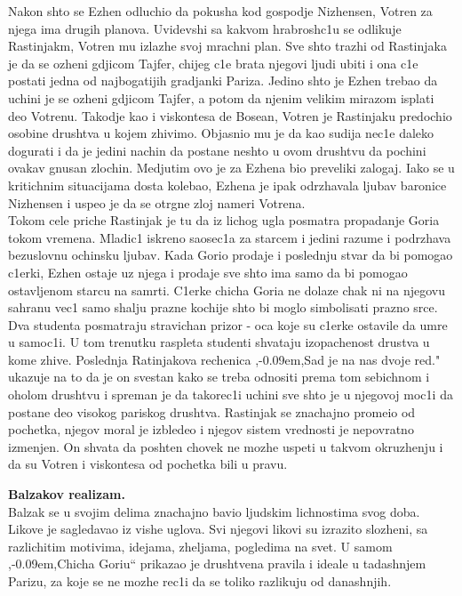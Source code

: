 \documentclass[11pt]{article}
\def \zn{,\kern-0.09em,}
\begin{document}
\begin{p}
Nakon shto se Ezhen odluchio da pokusha kod gospodje Nizhensen, Votren za njega ima drugih planova. Uvidevshi sa kakvom hrabrosh$ $c1u se odlikuje Rastinjakm, Votren mu izlazhe svoj mrachni plan. Sve shto trazhi od Rastinjaka je da se ozheni gdjicom Tajfer, chijeg c1e brata njegovi ljudi ubiti i ona c1e postati jedna od najbogatijih gradjanki Pariza. Jedino shto je Ezhen trebao da uchini je se ozheni gdjicom Tajfer, a potom da njenim velikim mirazom isplati deo Votrenu. Takodje kao i viskontesa de Bosean, Votren je Rastinjaku predochio osobine drushtva u kojem zhivimo. Objasnio mu je da kao sudija nec1e daleko dogurati i da je jedini nachin da postane neshto u ovom drushtvu da pochini ovakav gnusan zlochin. Medjutim ovo je za Ezhena bio preveliki zalogaj. Iako se u kritichnim situacijama dosta kolebao, Ezhena je ipak odrzhavala ljubav baronice Nizhensen i uspeo je da se otrgne zloj nameri Votrena. \\

Tokom cele priche Rastinjak je tu da iz lichog ugla posmatra propadanje Goria tokom vremena. Mladic1 iskreno saosec1a za starcem i jedini razume i podrzhava bezuslovnu ochinsku ljubav. Kada Gorio prodaje i poslednju stvar da bi pomogao c1erki, Ezhen ostaje uz njega i prodaje sve shto ima samo da bi pomogao ostavljenom starcu na samrti. C1erke chicha Goria ne dolaze chak ni na njegovu sahranu vec1 samo shalju prazne kochije shto bi moglo simbolisati prazno srce. Dva studenta posmatraju stravichan prizor - oca koje su c1erke ostavile da umre u samoc1i. U tom trenutku raspleta studenti shvataju izopachenost drustva u kome zhive. Poslednja Ratinjakova rechenica \zn Sad je na nas dvoje red." ukazuje na to da je on svestan kako se treba odnositi prema tom sebichnom i oholom drushtvu i spreman je da takorec1i uchini sve shto je u njegovoj moc1i da postane deo visokog pariskog drushtva.
Rastinjak se znachajno promeio od pochetka, njegov moral je izbledeo i njegov sistem vrednosti je nepovratno izmenjen. On s{}hvata da poshten chovek ne mozhe uspeti u takvom okruzhenju i da su Votren i viskontesa od pochetka bili u pravu.
\end{p}

\begin{p}
\textbf{Balzakov realizam.}\\
Balzak se u svojim delima znachajno bavio ljudskim lichnostima svog doba. Likove je sagledavao iz vishe uglova. Svi njegovi likovi su izrazito slozheni, sa razlichitim motivima, idejama, zheljama, pogledima na svet. U samom \zn Chicha Goriu“ prikazao je drushtvena pravila i ideale u tadashnjem Parizu, za koje se ne mozhe rec1i da se toliko razlikuju od danashnjih.
\end{p}
\end{document}
